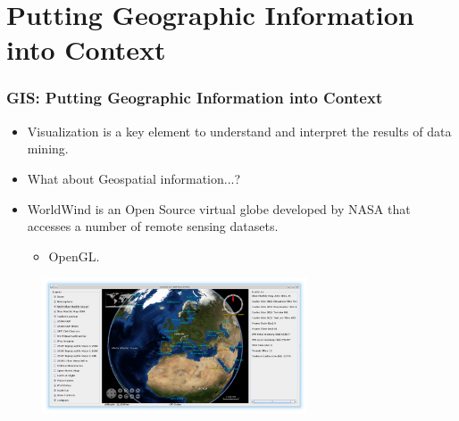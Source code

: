 \documentclass[hyperref={pdfpagelabels=true}]{beamer}
\begin{document}
\section{Putting Geographic Information into Context} 
\begin{frame}

\frametitle{GIS: Putting Geographic Information into Context}
    \begin{itemize}
      \item<1->Visualization is a key element to understand and interpret the results of data mining.%
      \item<2->What about Geospatial information...?
      \item<3->WorldWind is an Open Source virtual globe developed by NASA that accesses a number of remote sensing datasets.%
      \begin{itemize}
	  \item<3->OpenGL.%
       \end{itemize}
      \end{itemize}
      \begin{figure}  
	\includegraphics[width=0.7\textwidth]{bluemarble.png}
       \end{figure}  
\end{frame}
\end{document}
